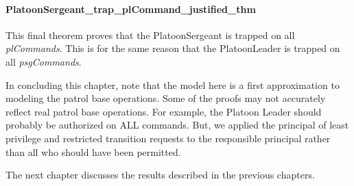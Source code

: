 \documentclass[../../main/main.tex]{subfiles}
\begin{document}
\paragraph*{PlatoonSergeant_trap_plCommand_justified_thm}
This final theorem proves that the PlatoonSergeant is trapped on all \textit{plCommands}.  This is for the same reason that the PlatoonLeader is trapped on all \textit{psgCommands}.

\HOLssmPlanPBTheoremsPlatoonSergeantXXtrapXXplCommandXXlemma

\HOLssmPlanPBTheoremsPlatoonSergeantXXtrapXXplCommandXXjustifiedXXlemma

\HOLssmPlanPBTheoremsPlatoonSergeantXXtrapXXplCommandXXjustifiedXXthm

In concluding this chapter, note that the model here is a first approximation to modeling the patrol base operations.  Some of the proofs may not accurately reflect real patrol base operations.  For example, the Platoon Leader should probably be authorized on ALL commands.  But, we applied the principal of least privilege and restricted transition requests to the responsible principal rather than all who should have been permitted.

The next chapter discusses the results described in the previous chapters.
\end{document}
